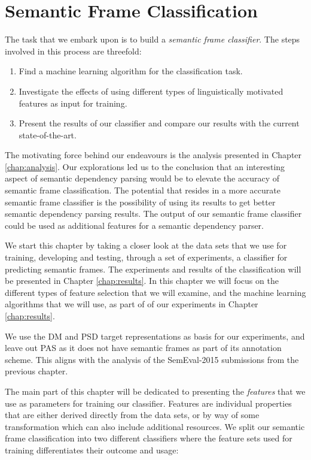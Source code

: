 \chapter{Semantic Frame Classification}
\label{chap:experiments}

The task that we embark upon is to build a \textit{semantic frame classifier}. The steps involved in this process are threefold: 

\begin{enumerate}
    \item Find a machine learning algorithm for the classification task.
    \item Investigate the effects of using different types of linguistically motivated features as input for training.
    \item Present the results of our classifier and compare our results with the current state-of-the-art.
\end{enumerate}

The motivating force behind our endeavours is the analysis presented in Chapter \ref{chap:analysis}. Our explorations led us to the conclusion that an interesting aspect of semantic dependency parsing would be to elevate the accuracy of semantic frame classification. The potential that resides in a more accurate semantic frame classifier is the possibility of using its results to get better semantic dependency parsing results. The output of our semantic frame classifier could be used as additional features for a semantic dependency parser. 

We start this chapter by taking a closer look at the data sets that we use for training, developing and testing, through a set of experiments, a classifier for predicting semantic frames. The experiments and results of the classification will be presented in Chapter \ref{chap:results}. In this chapter we will focus on the different types of feature selection that we will examine, and the machine learning algorithms that we will use, as part of of our experiments in Chapter \ref{chap:results}.

We use the DM and PSD target representations as basis for our experiments, and leave out PAS as it does not have semantic frames as part of its annotation scheme. This aligns with the analysis of the SemEval-2015 submissions from the previous chapter.

The main part of this chapter will be dedicated to presenting the \textit{features} that we use as parameters for training our classifier. Features are individual properties that are either derived directly from the data sets, or by way of some transformation which can also include additional resources. We split our semantic frame classification into two different classifiers where the feature sets used for training differentiates their outcome and usage:

